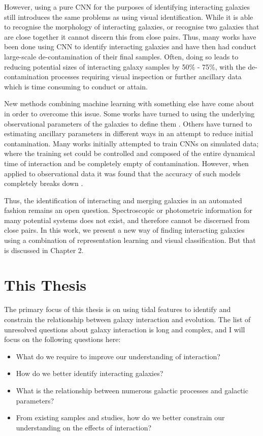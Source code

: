 However, using a pure CNN for the purposes of identifying interacting galaxies still introduces the same problems as using visual identification. While it is able to recognise the morphology of interacting galaxies, or recognise two galaxies that are close together it cannot discern this from close pairs. Thus, many works have been done using CNN to identify interacting galaxies and have then had conduct large-scale de-contamination of their final samples. Often, doing so leads to reducing potential sizes of interacting galaxy samples by 50\% - 75\%, with the de-contamination processes requiring visual inspection or further ancillary data which is time consuming to conduct or attain.

New methods combining machine learning with something else have come about in order to overcome this issue. Some works have turned to using the underlying observational parameters of the galaxies to define them \citep{2023ApJ...958...96R}. Others have turned to estimating ancillary parameters in different ways in an attempt to reduce initial contamination. Many works initially attempted to train CNNs on simulated data; where the training set could be controlled and composed of the entire dynamical time of interaction and be completely empty of contamination. However, when applied to observational data it was found that the accuracy of such models completely breaks down \citep{2019MNRAS.490.5390B, 2020A&C....3200390C}.

Thus, the identification of interacting and merging galaxies in an automated fashion remains an open question. Spectroscopic or photometric information for many potential systems does not exist, and therefore cannot be discerned from close pairs. In this work, we present a new way of finding interacting galaxies using a combination of representation learning \citep{2022MNRAS.513.1581W} and visual classification. But that is discussed in Chapter 2.

\section{This Thesis}
\noindent The primary focus of this thesis is on using tidal features to identify and constrain the relationship between galaxy interaction and evolution. The list of unresolved questions about galaxy interaction is long and complex, and I will focus on the following questions here:

\begin{itemize}
	\item What do we require to improve our understanding of interaction?
	\item How do we better identify interacting galaxies?
	\item What is the relationship between numerous galactic processes and galactic parameters?
	\item From existing samples and studies, how do we better constrain our understanding on the effects of interaction?
\end{itemize}

